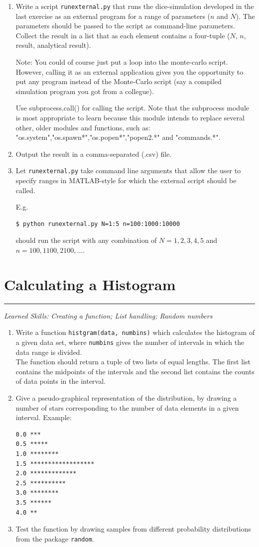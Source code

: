 \documentclass[smallheadings,12pt]{scrartcl}
\newcommand{\skills}[1]{\rule{1cm}{0pt}{\begin{minipage}{.8\textwidth}\small\em
      Learned Skills:  #1\end{minipage}}}
\begin{document}
\begin{enumerate}
\item Write a script \texttt{runexternal.py} that runs the
  dice-simulation developed in the last exercise as an external
  program for a range of parameters ($n$ and $N$). The parameters
  should be passed to the script as command-line parameters. Collect
  the result in a list that as each element contains a four-tuple
  ($N$, $n$, result, analytical result).

  Note: You could of course just put a loop into the monte-carlo
  script. However, calling it as an external application gives you the
  opportunity to put any program instead of the Monte-Carlo script
  (say a compiled simulation program you got from a collegue).
  
  Use subprocess.call() for calling the script. Note that the subprocess module is most appropriate to learn because this module intends to replace several other, older modules and functions, such as: "os.system","os.spawn*","os.popen*","popen2.*" and "commands.*".

\item Output the result in a comma-separated (.csv) file.
\item Let {\tt runexternal.py} take command line arguments that allow
  the user to specify ranges in MATLAB-style for which the external
  script should be called.

  E.g. 
\begin{verbatim}
$ python runexternal.py N=1:5 n=100:1000:10000 
\end{verbatim}
should run the script with any combination of $N=1,2,3,4,5$ and
$n=100,1100,2100,\ldots$. 
 
\end{enumerate}


\section{Calculating a Histogram}
\skills{Creating a function; List handling; Random numbers}

\begin{enumerate}
\item Write a function {\tt histgram(data, numbins)} which calculates the
  histogram of a given data set, where {\tt numbins} gives the number of intervals in which the data range is divided.\\
  The function should return a tuple of two lists of equal lengths. The first list contains the midpoints of
  the intervals and the second list contains the
  counts of data points in the interval. 
\item Give a pseudo-graphical representation of the distribution, by
  drawing a number of stars corresponding to the number of
  data elements in a given interval. Example:
\begin{verbatim}
0.0 ***
0.5 *****
1.0 ********
1.5 ******************
2.0 *************
2.5 **********
3.0 ********
3.5 ******
4.0 **
\end{verbatim}
\item Test the function by drawing samples from different probability
  distributions from the package {\tt random}. 
\end{enumerate}
\end{document}
